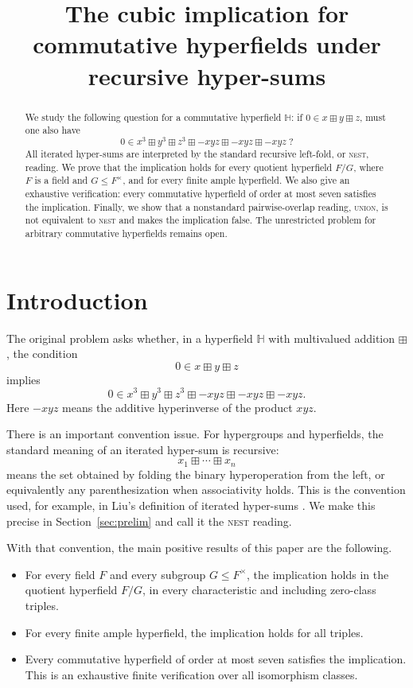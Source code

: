 \documentclass[12pt]{article}
\title{The cubic implication for commutative hyperfields under recursive hyper-sums}
\author{}
\date{}
\theoremstyle{definition}
\theoremstyle{remark}
\numberwithin{equation}{section}
\begin{document}
\maketitle

\begin{abstract}
We study the following question for a commutative hyperfield \(\mathbb H\):
if \(0\in x\boxplus y\boxplus z\), must one also have
\[
0\in x^3\boxplus y^3\boxplus z^3\boxplus -xyz\boxplus -xyz\boxplus -xyz\;?
\]
All iterated hyper-sums are interpreted by the standard recursive left-fold, or \textsc{nest}, reading.
We prove that the implication holds for every quotient hyperfield \(F/G\), where \(F\) is a field and
\(G\le F^\times\), and for every finite ample hyperfield.
We also give an exhaustive verification: every commutative hyperfield of order at most seven satisfies the implication.
Finally, we show that a nonstandard pairwise-overlap reading, \textsc{union}, is not equivalent to \textsc{nest} and makes the implication false.
The unrestricted problem for arbitrary commutative hyperfields remains open.
\end{abstract}

\section{Introduction}\label{sec:intro}

The original problem asks whether, in a hyperfield \(\mathbb H\) with multivalued addition \(\boxplus\), the condition
\[
0\in x\boxplus y\boxplus z
\]
implies
\[
0\in x^3\boxplus y^3\boxplus z^3\boxplus -xyz\boxplus -xyz\boxplus -xyz.
\]
Here \(-xyz\) means the additive hyperinverse of the product \(xyz\).

There is an important convention issue. For hypergroups and hyperfields, the standard meaning of an iterated hyper-sum is recursive:
\[
x_1\boxplus\cdots\boxplus x_n
\]
means the set obtained by folding the binary hyperoperation from the left, or equivalently any parenthesization when associativity holds. This is the convention used, for example, in Liu's definition of iterated hyper-sums \cite{Liu}. We make this precise in Section~\ref{sec:prelim} and call it the \textsc{nest} reading.

With that convention, the main positive results of this paper are the following.

\begin{itemize}
\item For every field \(F\) and every subgroup \(G\le F^\times\), the implication holds in the quotient hyperfield \(F/G\), in every characteristic and including zero-class triples.
\item For every finite ample hyperfield, the implication holds for all triples.
\item Every commutative hyperfield of order at most seven satisfies the implication. This is an exhaustive finite verification over all isomorphism classes.
\end{itemize}
\end{document}
